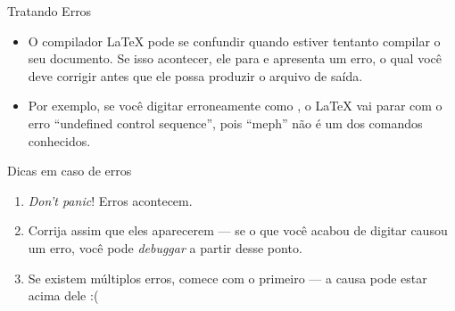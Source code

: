 \documentclass{beamer}
\begin{document}
\begin{frame}[fragile]{Tratando Erros}
	\begin{itemize}
		\item O compilador \LaTeX{} pode se confundir quando estiver tentanto 
		compilar o seu documento. Se isso acontecer, ele para e apresenta um erro, 
		o qual você deve corrigir antes que ele possa produzir o arquivo de saída.
		
		\item Por exemplo, se voc\^e digitar erroneamente  como ,
		o \LaTeX{} vai parar com o erro ``undefined control sequence'', pois ``meph'' não 
		é um dos comandos conhecidos.
	\end{itemize}
	
	\begin{block}{Dicas em caso de erros}
		\begin{enumerate}
			\item \textit{Don't panic}! Erros acontecem.
			\item Corrija assim que eles aparecerem --- se o que voc\^e acabou de digitar causou um erro, voc\^e pode \textit{debuggar} a partir desse ponto.
			\item Se existem m\'ultiplos erros, comece com o primeiro --- a causa pode estar acima dele :(
		\end{enumerate}
	\end{block}
\end{frame}

\end{document}
